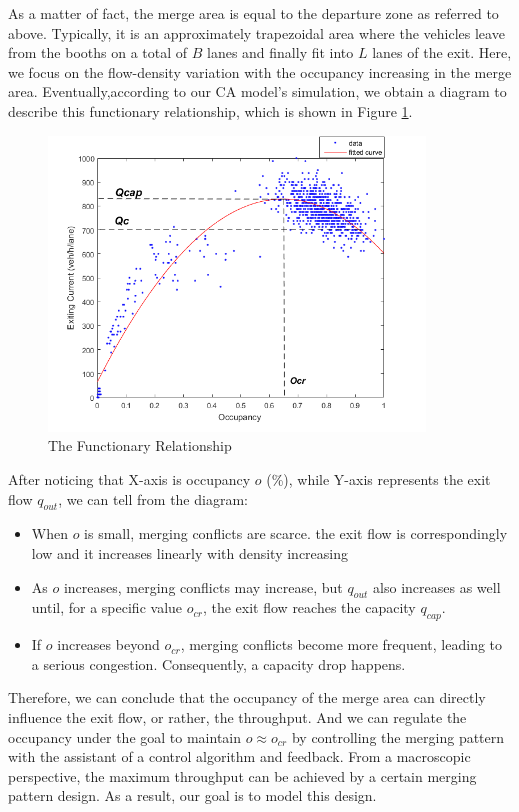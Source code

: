 \documentclass{mcmthesis}
\begin{document}
As a matter of fact, the merge area is equal to the
departure zone as referred to above. Typically, it
is an approximately trapezoidal area where the vehicles
leave from the booths on a total of $B$ lanes and finally
fit into $L$ lanes of the exit. Here, we focus on the
flow-density variation with the occupancy increasing
in the merge area. Eventually,according to our CA
model's simulation, we obtain a diagram to
describe this functionary relationship, which is shown
in Figure \ref{fig3}.

\begin{figure}[h]
\small
\centering
\includegraphics[width=10cm]{figure3}
\caption{The Functionary Relationship}\label{fig3}
\end{figure}

After noticing that X-axis is occupancy $o$ (\%), while
Y-axis represents the exit flow $q_{out}$, we can tell from
the diagram:
\begin{itemize}
\item When $o$ is small, merging conflicts are scarce.
the exit flow is correspondingly low and it
 increases linearly with density increasing
\item As $o$ increases, merging conflicts may increase, but
$q_{out}$ also increases as well until, for a specific value
$o_{cr}$, the exit flow reaches the capacity $q_{cap}$.
\item If $o$ increases beyond $o_{cr}$, merging conflicts
become more frequent, leading to a serious congestion.
Consequently, a capacity drop happens.
\end{itemize}
Therefore, we can conclude that the occupancy of the merge
area can directly influence the exit flow, or rather, the
throughput. And we can regulate the occupancy under the
goal to maintain $o  \approx  o_{cr}$ by controlling the merging
pattern with the assistant of a control algorithm and
feedback. From a macroscopic perspective, the maximum
throughput can be achieved by a certain merging pattern
design. As a result, our goal is to model this design.
\end{document}
